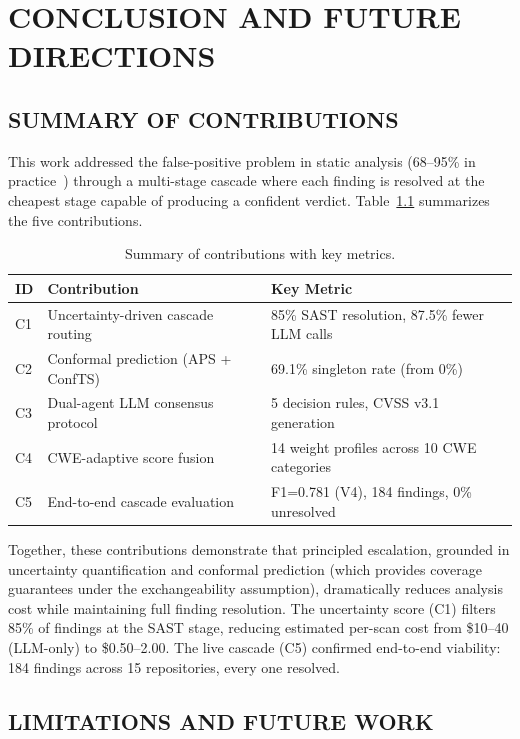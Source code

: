 \chapter{\uppercase{Conclusion and Future Directions}}

\section{\uppercase{Summary of Contributions}}

This work addressed the false-positive problem in static analysis
(68--95\% in practice~\cite{ghostsecurity2025, siftingnoise2026}) through a
multi-stage cascade where each finding is resolved at the cheapest stage
capable of producing a confident verdict. Table~\ref{tab:contributions}
summarizes the five contributions.

\begin{table}[H]
\centering
{\small
\caption{Summary of contributions with key metrics.}
\label{tab:contributions}
\begin{tabular}{lp{6.5cm}l}
\toprule
\textbf{ID} & \textbf{Contribution} & \textbf{Key Metric} \\
\midrule
C1 & Uncertainty-driven cascade routing & 85\% SAST resolution, 87.5\% fewer LLM calls \\
C2 & Conformal prediction (APS + ConfTS) & 69.1\% singleton rate (from 0\%) \\
C3 & Dual-agent LLM consensus protocol & 5 decision rules, CVSS v3.1 generation \\
C4 & CWE-adaptive score fusion & 14 weight profiles across 10 CWE categories \\
C5 & End-to-end cascade evaluation & F1=0.781 (V4), 184 findings, 0\% unresolved \\
\bottomrule
\end{tabular}
}
\end{table}

Together, these contributions demonstrate that principled escalation, grounded
in uncertainty quantification and conformal prediction (which provides coverage guarantees under the exchangeability assumption), dramatically reduces
analysis cost while maintaining full finding resolution. The uncertainty score
(C1) filters 85\% of findings at the SAST stage, reducing estimated per-scan
cost from \$10--40 (LLM-only) to \$0.50--2.00. The live cascade (C5) confirmed
end-to-end viability: 184 findings across 15 repositories, every one resolved.

\section{\uppercase{Limitations and Future Work}}

